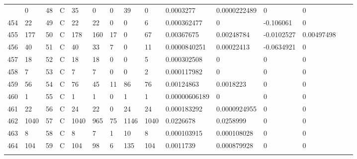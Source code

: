 \begin{longtable}{lllllllllllllll}
\begin{comment}
	453 & 0                 & 48  & C   & 35                & 0                 & 0                 & 39   & 0          & 0.0003277      & 0.0000222489   & 0             & 0            \\
	454 & 22                & 49  & C   & 22                & 22                & 0                 & 0    & 6          & 0.000362477    & 0              & -0.106061     & 0            \\
	455 & 177               & 50  & C   & 178               & 160               & 17                & 0    & 67         & 0.00367675     & 0.00248784     & -0.0102527    & 0.00497498   \\
	456 & 40                & 51  & C   & 40                & 33                & 7                 & 0    & 11         & 0.0000840251   & 0.00022413     & -0.0634921    & 0            \\
	457 & 18                & 52  & C   & 18                & 18                & 0                 & 0    & 5          & 0.000302508    & 0              & 0             & 0            \\
	458 & 7                 & 53  & C   & 7                 & 7                 & 0                 & 0    & 2          & 0.000117982    & 0              & 0             & 0            \\
	459 & 56                & 54  & C   & 76                & 45                & 11                & 86   & 76         & 0.00124863     & 0.0018223      & 0             & 0            \\
	460 & 1                 & 55  & C   & 1                 & 1                 & 0                 & 1    & 1          & 0.00000606189  & 0              & 0             & 0            \\
	461 & 22                & 56  & C   & 24                & 22                & 0                 & 24   & 24         & 0.000183292    & 0.0000924955   & 0             & 0            \\
	462 & 1040              & 57  & C   & 1040              & 965               & 75                & 1146 & 1040       & 0.0226678      & 0.0258999      & 0             & 0            \\
	463 & 8                 & 58  & C   & 8                 & 7                 & 1                 & 10   & 8          & 0.000103915    & 0.000108028    & 0             & 0            \\
	464 & 104               & 59  & C   & 104               & 98                & 6                 & 135  & 104        & 0.0011739      & 0.000879928    & 0             & 0            \\

\end{comment}
\end{longtable}
